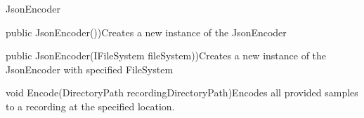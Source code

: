 \begin{class}{JsonEncoder}



    \begin{attributes}
    \end{attributes}
    
     \begin{constructors}
		\begin{constructor}{public JsonEncoder())}{Creates a new instance of the JsonEncoder}
		\end{constructor}
		\begin{constructor}{public JsonEncoder(IFileSystem fileSystem))}{Creates a new instance of the JsonEncoder with specified FileSystem}
			\begin{parameters}
			\end{parameters}
		\end{constructor}
	\end{constructors}

    \begin{methods}
        \begin{method}{void Encode(DirectoryPath recordingDirectoryPath)}{Encodes all provided samples to a recording at the specified location.}
            \begin{parameters}
            \end{parameters}
            \begin{exceptions}
            \end{exceptions}
        \end{method}
    \end{methods}
\end{class}

